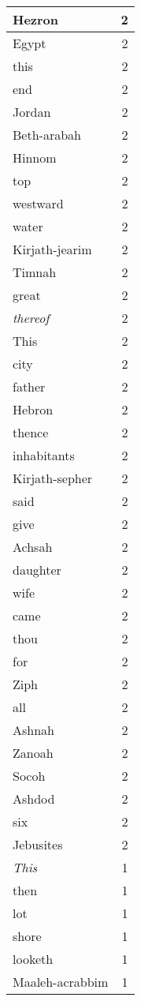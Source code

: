 \begin{center}
\begin{longtable}{l|r}
Hezron & 2\\ \hline 
Egypt & 2\\ \hline 
this & 2\\ \hline 
end & 2\\ \hline 
Jordan & 2\\ \hline 
Beth-arabah & 2\\ \hline 
Hinnom & 2\\ \hline 
top & 2\\ \hline 
westward & 2\\ \hline 
water & 2\\ \hline 
Kirjath-jearim & 2\\ \hline 
Timnah & 2\\ \hline 
great & 2\\ \hline 
\emph{thereof} & 2\\ \hline 
This & 2\\ \hline 
city & 2\\ \hline 
father & 2\\ \hline 
Hebron & 2\\ \hline 
thence & 2\\ \hline 
inhabitants & 2\\ \hline 
Kirjath-sepher & 2\\ \hline 
said & 2\\ \hline 
give & 2\\ \hline 
Achsah & 2\\ \hline 
daughter & 2\\ \hline 
wife & 2\\ \hline 
came & 2\\ \hline 
thou & 2\\ \hline 
for & 2\\ \hline 
Ziph & 2\\ \hline 
all & 2\\ \hline 
Ashnah & 2\\ \hline 
Zanoah & 2\\ \hline 
Socoh & 2\\ \hline 
Ashdod & 2\\ \hline 
six & 2\\ \hline 
Jebusites & 2\\ \hline 
\emph{This} & 1\\ \hline 
then & 1\\ \hline 
lot & 1\\ \hline 
shore & 1\\ \hline 
looketh & 1\\ \hline 
Maaleh-acrabbim & 1\\ \hline 

\end{longtable}
\end{center}
